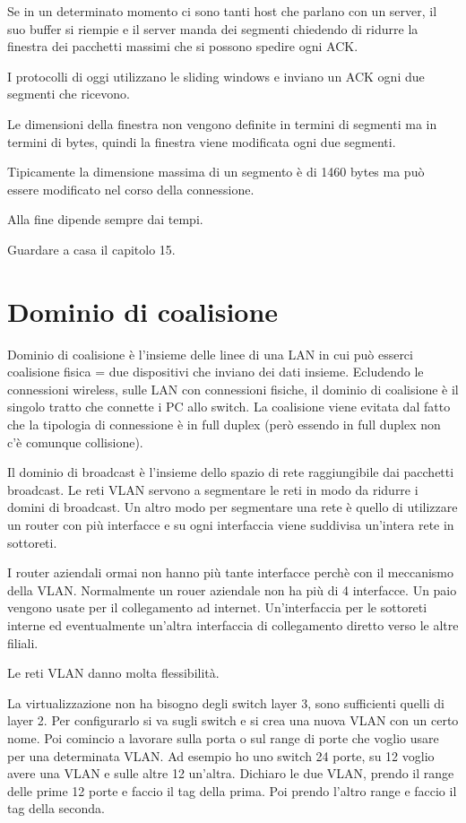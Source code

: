 \documentclass{article}
\begin{document}
    Se in un determinato momento ci sono tanti host che parlano con un server, il suo buffer si riempie e il server manda dei segmenti chiedendo di ridurre la finestra dei pacchetti massimi che si possono spedire ogni ACK.

    I protocolli di oggi utilizzano le sliding windows e inviano un ACK ogni due segmenti che ricevono.

    Le dimensioni della finestra non vengono definite in termini di segmenti ma in termini di bytes, quindi la finestra viene modificata ogni due segmenti.

    Tipicamente la dimensione massima di un segmento è di 1460 bytes ma può essere modificato nel corso della connessione.

    Alla fine dipende sempre dai tempi.

    Guardare a casa il capitolo 15.

    \section{Dominio di coalisione}

    Dominio di coalisione è l'insieme delle linee di una LAN in cui può esserci coalisione fisica = due dispositivi che inviano dei dati insieme.
    Ecludendo le connessioni wireless, sulle LAN con connessioni fisiche, il dominio di coalisione è il singolo tratto che connette i PC allo switch. La coalisione viene evitata dal fatto che la tipologia di connessione è in full duplex (però essendo in full duplex non c'è comunque collisione).

    Il dominio di broadcast è l'insieme dello spazio di rete raggiungibile dai pacchetti broadcast.
    Le reti VLAN servono a segmentare le reti in modo da ridurre i domini di broadcast.
    Un altro modo per segmentare una rete è quello di utilizzare un router con più interfacce e su ogni interfaccia viene suddivisa un'intera rete in sottoreti.

    I router aziendali ormai non hanno più tante interfacce perchè con il meccanismo della VLAN. Normalmente un rouer aziendale non ha più di 4 interfacce. Un paio vengono usate per il collegamento ad internet. Un'interfaccia per le sottoreti interne ed eventualmente un'altra interfaccia di collegamento diretto verso le altre filiali.

    Le reti VLAN danno molta flessibilità.

    La virtualizzazione non ha bisogno degli switch layer 3, sono sufficienti quelli di layer 2. Per configurarlo si va sugli switch e si crea una nuova VLAN con un certo nome. Poi comincio a lavorare sulla porta o sul range di porte che voglio usare per una determinata VLAN. Ad esempio ho uno switch 24 porte, su 12 voglio avere una VLAN e sulle altre 12 un'altra. Dichiaro le due VLAN, prendo il range delle prime 12 porte e faccio il tag della prima. Poi prendo l'altro range e faccio il tag della seconda.
\end{document}
